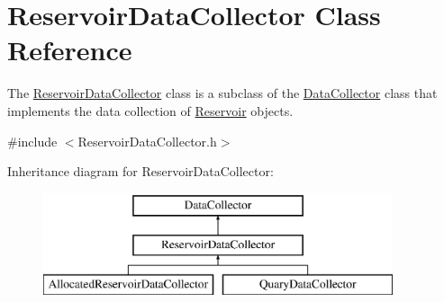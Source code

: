 \hypertarget{classReservoirDataCollector}{}\section{Reservoir\+Data\+Collector Class Reference}
\label{classReservoirDataCollector}


The {\ttfamily \mbox{\hyperlink{classReservoirDataCollector}{Reservoir\+Data\+Collector}}} class is a subclass of the {\ttfamily \mbox{\hyperlink{classDataCollector}{Data\+Collector}}} class that implements the data collection of \mbox{\hyperlink{classReservoir}{Reservoir}} objects.  




{\ttfamily \#include $<$Reservoir\+Data\+Collector.\+h$>$}

Inheritance diagram for Reservoir\+Data\+Collector\+:\begin{figure}[H]
\begin{center}
\leavevmode
\includegraphics[height=3.000000cm]{classReservoirDataCollector}
\end{center}
\end{figure}
